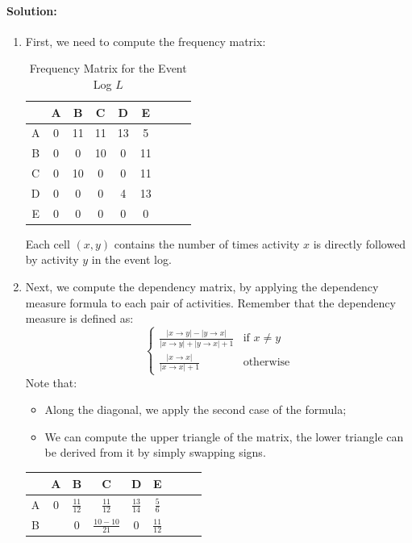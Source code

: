 \paragraph{Solution:}
\begin{enumerate}
    \item First, we need to compute the frequency matrix:
    \begin{table}[H]
    \centering
    \begin{tabular}{c|cccccccc}
        & A & B & C & D & E \\
        \hline
        A & 0 & 11 & 11 & 13 & 5 \\
        B & 0 & 0 & 10 & 0 & 11 \\
        C & 0 & 10 & 0 & 0 & 11 \\
        D & 0 & 0 & 0 & 4 & 13 \\
        E & 0 & 0 & 0 & 0 & 0 \\
    \end{tabular}
    \caption{Frequency Matrix for the Event Log \(L\)}
    \end{table}
    Each cell \((x,y)\) contains the number of times activity \(x\) is directly followed by activity \(y\) in the event log.
    \item Next, we compute the dependency matrix, by applying the dependency measure formula to each pair of activities.
    Remember that the dependency measure is defined as:
    \[
    \begin{cases}
        \frac{|x\rightarrow y| - |y\rightarrow x|}{|x\rightarrow y| + |y\rightarrow x| + 1} & \text{if } x \neq y \\
        \frac{|x\rightarrow x|}{|x\rightarrow x| + 1} & \text{otherwise}
    \end{cases}
    \]
    Note that:
    \begin{itemize}
        \item Along the diagonal, we apply the second case of the formula;
        \item We can compute the upper triangle of the matrix, the lower triangle can be derived from it by simply swapping signs.
    \end{itemize}
    \begin{table}[H]
    \centering
    \begin{tabular}{c|cccccccc}
        & A & B & C & D & E \\
        \hline
        A & 0 & $\frac{11}{12}$ & $\frac{11}{12}$ & $\frac{13}{14}$ & $\frac{5}{6}$ \\
        B &  & 0 & $\frac{10 - 10}{21}$ & 0 & $\frac{11}{12}$ \\

\end{tabular}
\end{table}
\end{enumerate}

